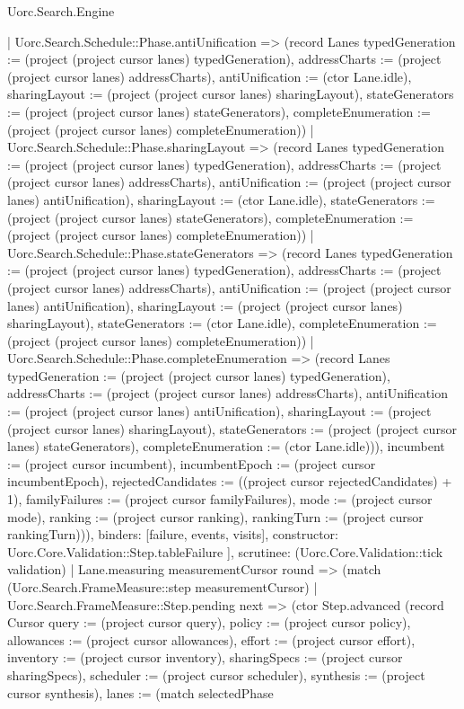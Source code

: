 \begin{lexlean}{Uorc.Search.Engine}
\begin{semanticmodule}
{{{{            | Uorc.Search.Schedule::Phase.antiUnification => (record Lanes {typedGeneration := (project (project cursor lanes) typedGeneration), addressCharts := (project (project cursor lanes) addressCharts), antiUnification := (ctor Lane.idle), sharingLayout := (project (project cursor lanes) sharingLayout), stateGenerators := (project (project cursor lanes) stateGenerators), completeEnumeration := (project (project cursor lanes) completeEnumeration)})
            | Uorc.Search.Schedule::Phase.sharingLayout => (record Lanes {typedGeneration := (project (project cursor lanes) typedGeneration), addressCharts := (project (project cursor lanes) addressCharts), antiUnification := (project (project cursor lanes) antiUnification), sharingLayout := (ctor Lane.idle), stateGenerators := (project (project cursor lanes) stateGenerators), completeEnumeration := (project (project cursor lanes) completeEnumeration)})
            | Uorc.Search.Schedule::Phase.stateGenerators => (record Lanes {typedGeneration := (project (project cursor lanes) typedGeneration), addressCharts := (project (project cursor lanes) addressCharts), antiUnification := (project (project cursor lanes) antiUnification), sharingLayout := (project (project cursor lanes) sharingLayout), stateGenerators := (ctor Lane.idle), completeEnumeration := (project (project cursor lanes) completeEnumeration)})
            | Uorc.Search.Schedule::Phase.completeEnumeration => (record Lanes {typedGeneration := (project (project cursor lanes) typedGeneration), addressCharts := (project (project cursor lanes) addressCharts), antiUnification := (project (project cursor lanes) antiUnification), sharingLayout := (project (project cursor lanes) sharingLayout), stateGenerators := (project (project cursor lanes) stateGenerators), completeEnumeration := (ctor Lane.idle)})), incumbent := (project cursor incumbent), incumbentEpoch := (project cursor incumbentEpoch), rejectedCandidates := ((project cursor rejectedCandidates) + 1), familyFailures := (project cursor familyFailures), mode := (project cursor mode), ranking := (project cursor ranking), rankingTurn := (project cursor rankingTurn)})),
          binders: [failure, events, visits],
          constructor: Uorc.Core.Validation::Step.tableFailure
        }
      ],
      scrutinee: (Uorc.Core.Validation::tick validation)
    }
    | Lane.measuring measurementCursor round => (match (Uorc.Search.FrameMeasure::step measurementCursor)
      | Uorc.Search.FrameMeasure::Step.pending next => (ctor Step.advanced (record Cursor {query := (project cursor query), policy := (project cursor policy), allowances := (project cursor allowances), effort := (project cursor effort), inventory := (project cursor inventory), sharingSpecs := (project cursor sharingSpecs), scheduler := (project cursor scheduler), synthesis := (project cursor synthesis), lanes := (match selectedPhase
}}
\end{semanticmodule}
\end{lexlean}

